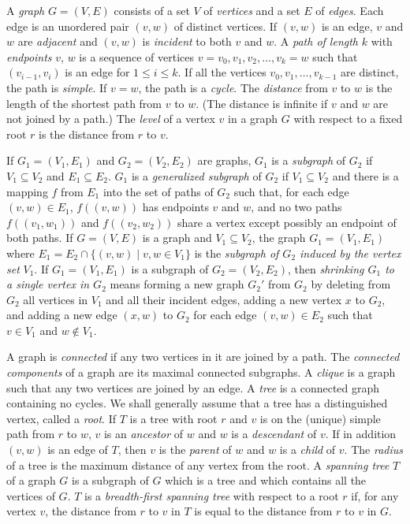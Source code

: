 \documentclass[12pt]{article}
\theoremstyle{remark}
\begin{document}
A \emph{graph} $G = (V, E)$ consists of a set $V$ of \emph{vertices} and a set $E$
of \emph{edges}. Each edge is an unordered pair $(v, w)$ of distinct vertices. If
$(v, w)$ is an edge, $v$ and $w$ are \emph{adjacent} and $(v, w)$ is \emph{incident}
to both $v$ and $w$. A \emph{path of length} $k$ with \emph{endpoints} $v$, $w$ is a
sequence of vertices $v = v_0, v_1, v_2, \ldots, v_k = w$ such that $(v_{i-1}, v_i)$
is an edge for $1 \leq i \leq k$. If all the vertices $v_0, v_1, \ldots, v_{k-1}$ are
distinct, the path is \emph{simple}. If $v = w$, the path is a \emph{cycle}. The
\emph{distance} from $v$ to $w$ is the length of the shortest path from $v$ to $w$.
(The distance is infinite if $v$ and $w$ are not joined by a path.) The \emph{level}
of a vertex $v$ in a graph $G$ with respect to a fixed root $r$ is the distance from
$r$ to $v$.

If $G_1 = (V_1, E_1)$ and $G_2 = (V_2, E_2)$ are graphs, $G_1$ is a
\emph{subgraph} of $G_2$ if $V_1 \subseteq V_2$ and $E_1 \subseteq E_2$. $G_1$ is a
\emph{generalized subgraph} of $G_2$ if $V_1 \subseteq V_2$ and there is a mapping
$f$ from $E_1$ into the set of paths of $G_2$ such that, for each edge $(v, w) \in
E_1$, $f((v,w))$ has endpoints $v$ and $w$, and no two paths $f((v_1, w_1))$ and
$f((v_2, w_2))$ share a vertex except possibly an endpoint of both paths. If
$G = (V, E)$ is a graph and $V_1 \subseteq V_2$, the graph $G_1 = (V_1, E_1)$ where
$E_1 = E_2 \cap \{(v, w) \mid v, w \in V_1\}$ is the \emph{subgraph of $G_2$ induced
by the vertex set} $V_1$. If $G_1 = (V_1, E_1)$ is a subgraph of $G_2 = (V_2, E_2)$,
then \emph{shrinking $G_1$ to a single vertex in $G_2$} means forming a new graph
$G_2'$ from $G_2$ by deleting from $G_2$ all vertices in $V_1$ and all their incident
edges, adding a new vertex $x$ to $G_2$, and adding a new edge $(x, w)$ to $G_2$ for
each edge $(v, w) \in E_2$ such that $v \in V_1$ and $w \notin V_1$.

A graph is \emph{connected} if any two vertices in it are joined by a path. The
\emph{connected components} of a graph are its maximal connected subgraphs. A
\emph{clique} is a graph such that any two vertices are joined by an edge. A
\emph{tree} is a connected graph containing no cycles. We shall generally assume
that a tree has a distinguished vertex, called a \emph{root}. If $T$ is a tree with
root $r$ and $v$ is on the (unique) simple path from $r$ to $w$, $v$ is an
\emph{ancestor} of $w$ and $w$ is a \emph{descendant} of $v$. If in addition $(v,
w)$ is an edge of $T$, then $v$ is the \emph{parent} of $w$ and $w$ is a
\emph{child} of $v$. The \emph{radius} of a tree is the maximum distance of any
vertex from the root. A \emph{spanning tree} $T$ of a graph $G$ is a subgraph of $G$
which is a tree and which contains all the vertices of $G$. $T$ is a
\emph{breadth-first spanning tree} with respect to a root $r$ if, for any vertex $v$,
the distance from $r$ to $v$ in $T$ is equal to the distance from $r$ to $v$ in $G$.
\end{document}
